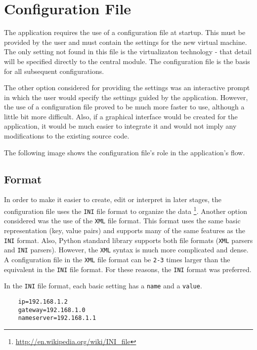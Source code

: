 \chapter{Configuration File} \label{chapter:config}
The \texttt{\project}application requires the use of a configuration file at 
startup. This must be provided by the user and must contain the settings 
for the new virtual machine. The only setting not found in this file is the 
virtualizaton technology - that detail will be specified directly to the central 
module. The configuration file is the basis for all subsequent configurations.

The other option considered for providing the settings was an interactive 
prompt in which the user would specify the settings guided by the application. 
However, the use of a configuration file proved to be much more faster to use, 
although a little bit more difficult. Also, if a graphical interface would be 
created for the application, it would be much easier to integrate it and would 
not imply any modifications to the existing source code.

The following image shows the configuration file's role in the application's 
flow.
\\

\section{Format} \label{sec:config-format}
In order to make it easier to create, edit or interpret in later stages, the 
configuration file uses the \texttt{INI} file format to organize the data
\footnote{\url{http://en.wikipedia.org/wiki/INI_file}}. Another option 
considered was the use of the \texttt{XML} file format. This format uses the 
same basic representation (key, value pairs) and supports many of the same 
features as the \texttt{INI} format. Also, Python standard library supports 
both file formats (\texttt{XML} parsers and \texttt{INI} parsers). However, 
the \texttt{XML} syntax is much more complicated and dense. A configuration 
file in the \texttt{XML} file format can be \texttt{2-3} times larger than the 
equivalent in the \texttt{INI} file format. For these reasons, the \texttt{INI} 
format was preferred.

In the \texttt{INI} file format, each basic setting has a \texttt{name} 
and a \texttt{value}.
\\
\lstset{language=Python,caption=Basic configuration setting,
label=lst:conf-settings}
\begin{lstlisting}
	ip=192.168.1.2
	gateway=192.168.1.0
	nameserver=192.168.1.1
\end{lstlisting}

